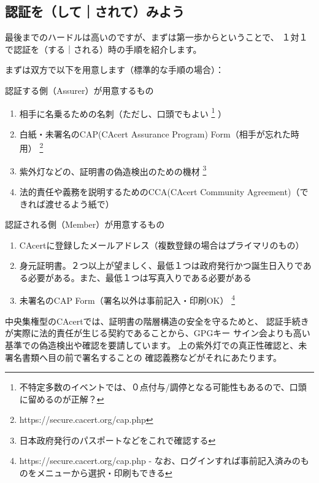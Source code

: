 \documentclass[mingoth,a4paper]{jsarticle}
\begin{document}
\subsection{認証を（して｜されて）みよう}
最後までのハードルは高いのですが、まずは第一歩からということで、
１対１で認証を（する｜される）時の手順を紹介します。

まずは双方で以下を用意します（標準的な手順の場合）：

\begin{itembox}[l]{認証する側（Assurer）が用意するもの}
\begin{enumerate}
\item 相手に名乗るための名刺（ただし、口頭でもよい
\footnote{不特定多数のイベントでは、０点付与/調停となる可能性もあるので、口頭に留めるのが正解？}
）
\item 白紙・未署名のCAP(CAcert Assurance Program) Form（相手が忘れた時用）
\footnote{https://secure.cacert.org/cap.php}
\item 紫外灯などの、証明書の偽造検出のための機材
\footnote{日本政府発行のパスポートなどをこれで確認する}
\item 法的責任や義務を説明するためのCCA(CAcert Community Agreement)（できれば渡せるよう紙で）
\end{enumerate}
\end{itembox}

\begin{itembox}[l]{認証される側（Member）が用意するもの}
\begin{enumerate}
\item CAcertに登録したメールアドレス（複数登録の場合はプライマリのもの）
\item 身元証明書。２つ以上が望ましく、最低１つは政府発行かつ誕生日入りである必要がある。また、最低１つは写真入りである必要がある
\item 未署名のCAP Form（署名以外は事前記入・印刷OK）
\footnote{https://secure.cacert.org/cap.php - なお、ログインすれば事前記入済みのものをメニューから選択・印刷もできる}
\end{enumerate}
\end{itembox}

中央集権型のCAcertでは、証明書の階層構造の安全を守るためと、
認証手続きが実際に法的責任が生じる契約であることから、GPGキー
サイン会よりも高い基準での偽造検出や確認を要請しています。
上の紫外灯での真正性確認と、未署名書類へ目の前で署名することの
確認義務などがそれにあたります。
\end{document}
